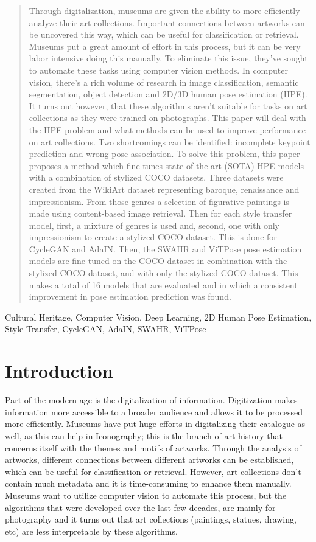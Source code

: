 \documentclass[conference]{IEEEtran}
\begin{document}
\begin{abstract}
Through digitalization, museums are given the ability to more efficiently analyze their art collections.
Important connections between artworks can be uncovered this way, which can be useful for classification or retrieval.
Museums put a great amount of effort in this process, but it can be very labor intensive doing this manually.
To eliminate this issue, they've sought to automate these tasks using computer vision methods.
In computer vision, there's a rich volume of research in image classification, semantic segmentation, object detection and 2D/3D human pose estimation (HPE).
It turns out however, that these algorithms aren't suitable for tasks on art collections as they were trained on photographs.
This paper will deal with the HPE problem and what methods can be used to improve performance on art collections.
Two shortcomings can be identified: incomplete keypoint prediction and wrong pose association.
To solve this problem, this paper proposes a method which fine-tunes state-of-the-art (SOTA) HPE models with a combination of stylized COCO datasets.
Three datasets were created from the WikiArt dataset representing baroque, renaissance and impressionism.
From those genres a selection of figurative paintings is made using content-based image retrieval.
Then for each style transfer model, first, a mixture of genres is used and, second, one with only impressionism to create a stylized COCO dataset.
This is done for CycleGAN and AdaIN.
Then, the SWAHR and ViTPose pose estimation models are fine-tuned on the COCO dataset in combination with the stylized COCO dataset, and with only the stylized COCO dataset.
This makes a total of 16 models that are evaluated and in which a consistent improvement in pose estimation prediction was found.
\end{abstract}

\begin{IEEEkeywords}
Cultural Heritage, Computer Vision, Deep Learning, 2D Human Pose Estimation, Style Transfer, CycleGAN, AdaIN, SWAHR, ViTPose
\end{IEEEkeywords}

\section{Introduction}
Part of the modern age is the digitalization of information.
Digitization makes information more accessible to a broader audience and allows it to be processed more efficiently.
Museums have put huge efforts in digitalizing their catalogue as well, as this can help in Iconography; this is the branch of art history that concerns itself with the themes and motifs of artworks.
Through the analysis of artworks, different connections between different artworks can be established, which can be useful for classification or retrieval.
However, art collections don't contain much metadata and it is time-consuming to enhance them manually.
Museums want to utilize computer vision to automate this process, but the algorithms that were developed over the last few decades, are mainly for photography and it turns out that art collections (paintings, statues, drawing, etc) are less interpretable by these algorithms.
\end{document}
